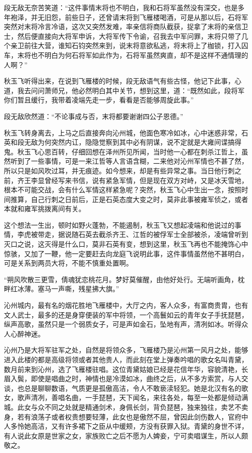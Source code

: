 段无敌无奈苦笑道：“这件事情末将也不明白，我和石将军虽然没有深交，也是多年袍泽，并无旧怨，前些日子，还曾请末将到飞雁楼喝酒，可是从那以后，石将军突然对末将冷言冷语，这次又突然发难，率亲信将商队截获，捉拿了末将的亲信卫士，然后便直接向大将军申诉，大将军传下令谕，召我去中军问罪，末将只带了几个亲卫前往大营，谁知石钧突然来到，说末将意欲私逃，将末将上了枷锁，打入囚车，末将也不明白为何石将军如此作为，石将军虽然爽直，却不是这样不通情理的人啊？”

秋玉飞听得出来，在说到飞雁楼的时候，段无敌语气有些古怪，他记下此事，心道，我去问问萧师兄，他必然明白其中关节，想到这里，道：“既然如此，段将军你们暂且缓行，我带着凌端先走一步，看看是否能够周旋此事。”

段无敌欣然道：“不论事成与否，末将都要谢谢四公子恩德。”

秋玉飞转身离去，上马之后直接奔向沁州城，他面色寒冷如冰，心中迷惑非常，石英和段无敌为何突然内讧，隐隐觉察到其中必有阴谋，说不定就是大雍间谍搞得鬼。秋玉飞心思百转，仔细回想在泽州所见所闻，当时他一心都在刺杀江哲上，虽然听到了一些事情，可是一来江哲等人言语含糊，二来他对沁州军情也不甚了然，所以只是如风吹过耳，并无痕迹。如今想来，却是有些异常之事。当日他行刺之前，齐王李显曾经写来书信，说有紧急军情，但是现在双方对峙，又是冰天雪地，根本不可能交战，会有什么军情这样紧急呢？突然，秋玉飞心中生出一念，按照时间推算，自己行刺之日前后，正是石英态度大变之时，莫非此事被雍军侦之，或者本就和雍军挑拨离间有关。

这个想法一生出，顿时如野火蓬勃，不能遏制，秋玉飞又想起凌端和他说过的事情，李虎被带走，据说随石英去截杀齐王、江哲的被俘军士全部被杀，凌端曾听到灭口之说，这灭得是什么口，莫非石英有变，想到这里，秋玉飞再也不能掩饰心中惊骇，又加了一鞭，他一定要赶去向龙庭飞说明此事，这件事情虽然他不甚明白，可是关系到两员大将，不能不慎重处置啊。

“朔风吹散三更雪，倩魂犹恋桃花月。梦好莫催醒，由他好处行。无端听画角，枕畔红冰薄。塞马一声嘶，残星拂大旗。”

沁州城内，最有名的烟花胜地飞雁楼中，大厅之内，客人众多，有富商贵胄，也有文人武士，最多的还是身穿便装的军中将领，一个高鬟如云的青年女子手抚琵琶，纵声高歌，虽然只是一个弱质女子，可是声如金石，坠地有声，清冽如冰。听得众人心醉神迷。

沁州乃是大将军驻军之处，自然是将领众多，飞雁楼乃是沁州第一风月之处，能够进入此楼的都是高级将领或者其他贵人，而此刻在堂上弹奏吟唱的歌女名叫青黛，数月前来到沁州，选了飞雁楼驻唱。这位青黛姑娘已经是花信年华，容貌清艳，长眉入鬓，即使是唱曲之时，神情也是冷漠如冰，曲终之后，从不多方索赏，与人交谈，也总是聊聊数语，气质更是孤傲高洁，令人不敢亵渎轻犯。她是北汉有名的歌女，歌声清冽，善唱名曲，一手琵琶，天下闻名，来往各处，每至一处都是倾动满城。此女与众不同之处就是精通剑术，身佩长剑，背负琵琶，独来独往，卖艺不卖身，若有浪荡子或者权贵想要轻薄，此女也是傲然不屈，曾因此剑伤数人，官府中人多怜她高洁，又有许多裙下之臣从中缓颊，方没有获罪入狱。青黛的身世不详，有人说此女原是世家之女，家族败亡之后不愿为人婢妾，宁可卖唱谋生，所以人颇敬之。

